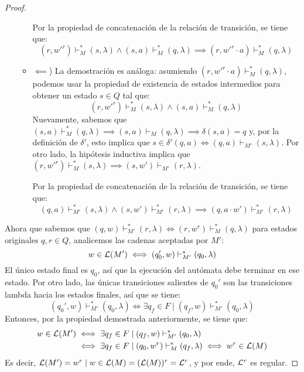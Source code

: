 \begin{proof}
\begin{itemize}
\begin{itemize}
                        Por la propiedad de concatenación de la relación de transición, se tiene que:
                        $$
                            (r, w'^r) \vdash_M^* (s, \lambda) \land (s, a) \vdash_M^* (q, \lambda) \implies (r, w'^r \cdot a) \vdash_M^* (q, \lambda)
                        $$
                  \item $\impliedby$) La demostración es análoga: asumiendo $(r, w'^r \cdot a) \vdash_M^* (q, \lambda)$, podemos usar la propiedad de existencia de estados intermedios para obtener un estado $s \in Q$ tal que:
                        $$
                            (r, w'^r) \vdash_M^* (s, \lambda) \land (s, a) \vdash_M^* (q, \lambda)
                        $$
                        Nuevamente, sabemos que $(s, a) \vdash_M^* (q, \lambda) \implies (s, a) \vdash_M (q, \lambda) \implies \delta(s, a) = q$ y, por la definición de $\delta'$, esto implica que $s \in \delta'(q, a) \iff (q, a) \vdash_{M'} (s, \lambda)$. Por otro lado, la hipótesis inductiva implica que $(r, w'^r) \vdash_M^* (s, \lambda) \implies (s, w') \vdash_{M'} (r, \lambda)$.

                        Por la propiedad de concatenación de la relación de transición, se tiene que:
                        $$
                            (q, a) \vdash_{M'}^* (s, \lambda) \land (s, w') \vdash_{M'}^* (r, \lambda) \implies (q, a \cdot w') \vdash_{M'}^* (r, \lambda)
                        $$
              \end{itemize}
    \end{itemize}

    Ahora que sabemos que $(q, w) \vdash_{M'}^* (r, \lambda) \iff (r, w^r) \vdash_M^* (q, \lambda)$ para estados originales $q, r \in Q$, analicemos las cadenas aceptadas por $M'$:
    $$
        w \in \mathcal{L}(M') \iff (q_0', w) \vdash_{M'}^* (q_0, \lambda)
    $$
    El único estado final es $q_0$, así que la ejecución del autómata debe terminar en ese estado. Por otro lado, las únicas transiciones salientes de $q_0'$ son las transiciones lambda hacia los estados finales, así que se tiene:
    $$
        (q_0', w) \vdash_{M'}^* (q_0, \lambda) \iff \exists q_f \in F \mid (q_f, w) \vdash_{M'}^* (q_0, \lambda)
    $$
    Entonces, por la propiedad demostrada anteriormente, se tiene que:
    $$
    \begin{aligned}        
        w \in \mathcal{L}(M') & \iff \exists q_f \in F \mid (q_f, w) \vdash_{M'}^* (q_0, \lambda) \\
        & \iff \exists q_f \in F \mid (q_0, w^r) \vdash_{M}^* (q_f, \lambda) \iff w^r \in \mathcal{L}(M)
    \end{aligned}
    $$
    Es decir, $\mathcal{L}(M') = {w^r \mid w \in \mathcal{L}(M)} = (\mathcal{L}(M))^r = \mathcal{L}^r$, y por ende, $\mathcal{L}^r$ es regular.
\end{proof}
